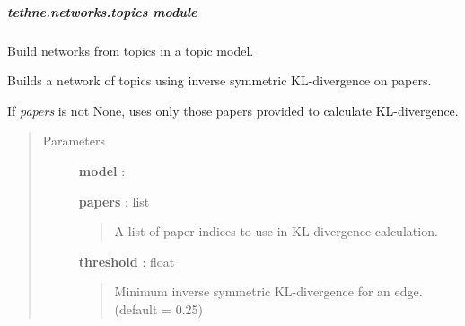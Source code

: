 \documentclass[letterpaper,10pt,english]{sphinxmanual}
\begin{document}
\subparagraph{tethne.networks.topics module}
\label{tethne.networks.topics:module-tethne.networks.topics}\label{tethne.networks.topics::doc}\label{tethne.networks.topics:tethne-networks-topics-module}
Build networks from topics in a topic model.

\begin{fulllineitems}
\label{tethne.networks.topics:tethne.networks.topics.paper_coupling}
\end{fulllineitems}


\begin{fulllineitems}
\label{tethne.networks.topics:tethne.networks.topics.term_coupling}
\end{fulllineitems}


\begin{fulllineitems}
\label{tethne.networks.topics:tethne.networks.topics.topic_coupling}
Builds a network of topics using inverse symmetric KL-divergence on papers.

If \emph{papers} is not None, uses only those papers provided to calculate
KL-divergence.
\begin{quote}\begin{description}
\item[{Parameters}] \leavevmode
\textbf{model} : {\hyperref[tethne.model.corpus.ldamodel:tethne.model.corpus.ldamodel.LDAModel]{}}

\textbf{papers} : list
\begin{quote}

A list of paper indices to use in KL-divergence calculation.
\end{quote}

\textbf{threshold} : float
\begin{quote}

Minimum inverse symmetric KL-divergence for an edge. (default = 0.25)
\end{quote}

\end{description}\end{quote}

\end{fulllineitems}
\end{document}
